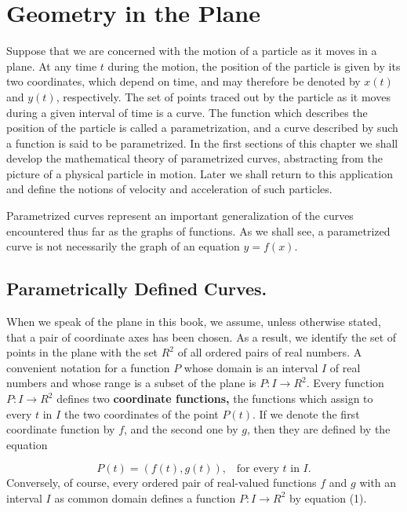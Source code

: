 \chapter{Geometry in the Plane} \label{chp 10}
Suppose that we are concerned with the motion of a particle as it moves in a plane. At any time $t$ during the motion, the position of the particle is given by its two coordinates, which depend on time, and may therefore be denoted by $x(t)$ and $y(t)$, respectively. The set of points traced out by the particle as it moves during a given interval of time is a curve. The function which describes the position of the particle is called a parametrization, and a curve described by such a function is said to be parametrized. In the first sections of this chapter we shall develop the mathematical theory of parametrized curves, abstracting from the picture of a physical particle in motion. Later we shall return to this application and define the notions of velocity and acceleration of such particles.

Parametrized curves represent an important generalization of the curves encountered thus far as the graphs of functions. As we shall see, a parametrized curve is not necessarily the graph of an equation $y = f(x)$.

\section{Parametrically Defined Curves.}\label{sec 10.1} 
When we speak of the plane in this book, we assume, unless otherwise stated, that a pair of coordinate axes has been chosen. As a result, we identify the set of points in the plane with the set $R^2$ of all ordered pairs of real numbers. A convenient notation for a function $P$ whose domain is an interval $I$ of real numbers and whose range is a subset of the plane is $P : I \rightarrow R^2$. Every function $P : I \rightarrow R^2$ defines two \textbf{coordinate functions,} the functions which assign to every $t$ in $I$ the two coordinates of the point $P(t)$. If we denote the first coordinate function by $f$, and the second one by $g$, then they are defined by the equation


\begin{equation}
P(t) = (f(t), g(t)), \;\;\;\mbox{for every $t$ in $I$.}  
\label{eq10.1.1}
\end{equation}
Conversely, of course, every ordered pair of real-valued functions $f$ and $g$ with an interval $I$ as common domain defines a function $P : I \rightarrow R^2$ by equation (1).

